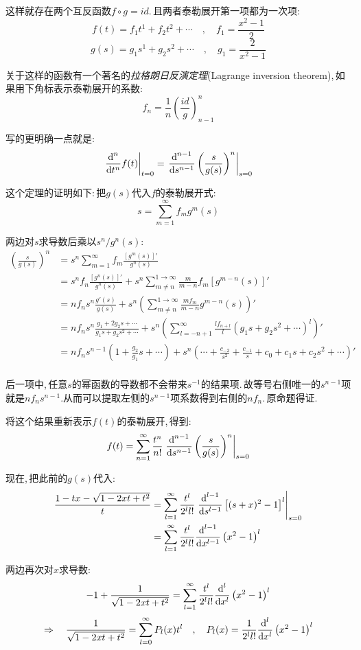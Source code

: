 这样就存在两个互反函数$f\circ g=id$.\,且两者泰勒展开第一项都为一次项:
\[f(t)=f_1t^1+f_2t^2+\cdots\quad ,\quad f_1=\frac{x^2-1}{2}\]
\[g(s)=g_1s^1+g_2s^2+\cdots\quad ,\quad g_1=\frac{2}{x^2-1}\]

关于这样的函数有一个著名的\emph{拉格朗日反演定理}(Lagrange inversion theorem),\,如果用下角标表示泰勒展开的系数:
\[f_n=\frac{1}{n}\left(\frac{id}{g}\right)^n_{n-1}\]

写的更明确一点就是:
\[\left.\frac{\textrm{d}^n}{\textrm{d} t^n}f(t)\right|_{t=0}=\left.\frac{\textrm{d}^{n-1}}{\textrm{d} s^{n-1}}\left(\frac{s}{g(s)}\right)^n\right|_{s=0}\]

这个定理的证明如下:\,把$g(s)$代入$f$的泰勒展开式:
\[s=\sum_{m=1}^\infty f_m g^m(s)\]

两边对$s$求导数后乘以$s^n/g^n(s)$:
\begin{align*}
\left(\frac{s}{g(s)}\right)^n &=s^n\sum_{m=1}^\infty f_m \frac{\left[g^m(s)\right]'}{g^n(s)}\\
&=s^nf_n\frac{\left[g^n(s)\right]'}{g^n(s)}+s^n\sum_{m\neq n}^{1\to\infty}\frac{m}{m-n}f_m\left[g^{m-n}(s)\right]'\\
&=nf_ns^n\frac{g'(s)}{g(s)}+s^n\left(\sum_{m\neq n}^{1\to\infty}\frac{mf_m}{m-n} g^{m-n}(s)\right)'\\
&=nf_ns^n\frac{g_1+2g_2s+\cdots}{g_1s+g_2s^2+\cdots}+s^n\left(\sum_{l=-n+1}^{\infty}\frac{lf_{n+l}}{l} (g_1s+g_2s^2+\cdots)^l\right)'\\
&=nf_ns^{n-1}\left(1+\frac{g_2}{g_1}s+\cdots\right) +s^n\left(\cdots+\frac{c_{-2}}{s^2}+\frac{c_{-1}}{s}+c_0+c_1s+c_2s^2+\cdots\right)'\\
\end{align*}

后一项中,\,任意$s$的幂函数的导数都不会带来$s^{-1}$的结果项.\,故等号右侧唯一的$s^{n-1}$项就是$nf_ns^{n-1}$.从而可以提取左侧的$s^{n-1}$项系数得到右侧的$nf_n$.\,原命题得证.

将这个结果重新表示$f(t)$的泰勒展开,\,得到:
\[f(t)=\sum_{n=1}^{\infty}\frac{t^n}{n!}\left.\frac{\textrm{d}^{n-1}}{\textrm{d} s^{n-1}}\left(\frac{s}{g(s)}\right)^n\right|_{s=0}\]

现在,\,把此前的$g(s)$代入:
\begin{align*}
\frac{1-tx-\sqrt{1-2xt+t^2}}{t} &=\sum_{l=1}^{\infty}\frac{t^l}{2^l l!}\left.\frac{\textrm{d}^{l-1}}{\textrm{d} s^{l-1}}\left[(s+x)^2-1\right]^l\right|_{s=0}\\
&=\sum_{l=1}^{\infty}\frac{t^l}{2^l l!}\frac{\textrm{d}^{l-1}}{\textrm{d} x^{l-1}}\left(x^2-1\right)^l
\end{align*}

两边再次对$x$求导数:
\[-1+\frac{1}{\sqrt{1-2xt+t^2}}=\sum_{l=1}^{\infty}\frac{t^l}{2^l l!}\frac{\textrm{d}^{l}}{\textrm{d} x^{l}}\left(x^2-1\right)^l\]
\[\Rightarrow\quad \frac{1}{\sqrt{1-2xt+t^2}}=\sum_{l=0}^{\infty}P_l(x)t^l\quad ,\quad P_l(x)=\frac{1}{2^l l!}\frac{\textrm{d}^{l}}{\textrm{d} x^{l}}\left(x^2-1\right)^l\]


